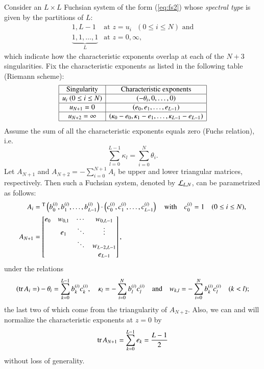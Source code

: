\documentclass[12pt]{article}
\numberwithin{equation}{section}
\begin{document}
Consider an $L \times L$ Fuchsian system 
of the form (\ref{eq:fs2})
whose {\it spectral type} 
is given by the 
partitions of $L$:
\[
\begin{array}{ll}
1, L-1
&
\text{at $z=u_i$ $(0 \leq i \leq N )$ and} 
\\
\underbrace{1,1, \ldots,1}_{L}
&
\text{at $z=0, \infty$,}
\end{array}
\]
which indicate how the characteristic exponents overlap
at each of the $N+3$ singularities.
Fix the characteristic exponents as listed in the following table (Riemann scheme):
\begin{equation} 
\label{eq:rs}
\begin{array}{|c|c|}
\hline
\text{Singularity} & \text{Characteristic exponents}  \\ \hline
u_i  \mbox{\ } (0 \leq i \leq N )& (-\theta_i, 0, \ldots,0)  \\ \hline
u_{N+1}=0 & (e_0,e_1,\ldots,e_{L-1})  \\ \hline    
u_{N+2}=\infty & (\kappa_{0}-e_0,\kappa_{1}-e_1, \ldots,\kappa_{L-1}-e_{L-1} )  \\ 
\hline
   \end{array}
\end{equation}
Assume the sum of all the characteristic exponents equals zero
(Fuchs relation), 
i.e.
\begin{equation}
\label{eq:norm1}
\sum_{l=0}^{L-1}\kappa_l
=\sum_{i=0}^N \theta_i.
\end{equation}
Let
$A_{N+1}$ and $A_{N+2}=-\sum_{i=0}^{N+1} A_i$
be upper and lower triangular matrices, respectively.
Then such a Fuchsian system,
denoted by  ${\cal L}_{L,N}$,
can be
 parametrized as follows:
 \begin{align}
A_i 
&=  {}^{\rm T}\left(b_0^{(i)}, b_1^{(i)}, \ldots ,b_{L-1}^{(i)}\right)
\cdot
\left(c_0^{(i)}, c_1^{(i)}, \ldots ,c_{L-1}^{(i)}\right)\quad \text{with} \quad 
c_0^{(i)}=1
\quad
(0 \leq i \leq N),
 \nonumber
\\
A_{N+1} 
&= 
 \begin{bmatrix}
   e_0 &   w_{0,1}      & \cdots  & w_{0,L-1}
   \\
        & e_1 &  \ddots       & \vdots
   \\     
          &        &\ddots& w_{L-2,L-1}
   \\
          &        &          & e_{L-1}    
\end{bmatrix},
 \label{eq:resmat}
\end{align}
under the relations
\[
({\rm tr \,} 
A_i =)-\theta_i=
  \sum_{k=0}^{L-1} b_k^{(i)}c_k^{(i)},
 \quad
 \kappa_l=
 - \sum_{i=0}^{N} b_l^{(i)} c_l^{(i)}
 \quad
\text{and} \quad 
w_{k,l}=-\sum_{i=0}^N b_k^{(i)} c_l^{(i)}
\quad (k < l);
\]
the last two of which
come from 
the triangularity of $A_{N+2}$.
Also,
we can and will normalize the characteristic exponents
at $z=0$
by
\begin{equation}
\label{eq:norm2}
{\rm tr \,} 
A_{N+1}=\sum_{k=0}^{L-1} e_k=\frac{L-1}{2}
\end{equation}
without loss of generality.
\end{document}
